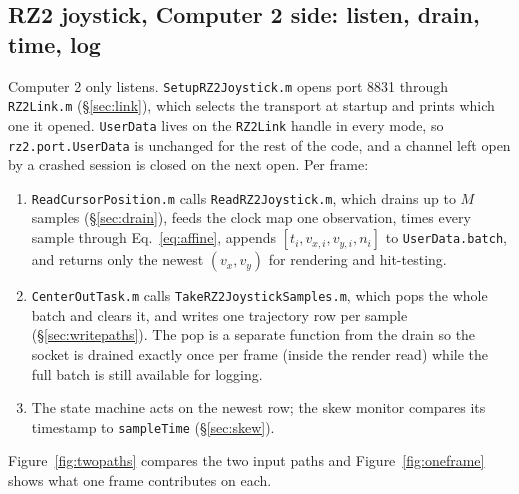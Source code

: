 \documentclass[11pt,a4paper]{article}
\newcommand{\code}[1]{\texttt{\small #1}}
\newcommand{\file}[1]{\texttt{\small #1}}
\begin{document}
\subsection{RZ2 joystick, Computer 2 side: listen, drain, time, log}

Computer 2 only listens. \file{SetupRZ2Joystick.m} opens port 8831 through
\file{RZ2Link.m} (\S\ref{sec:link}), which selects the transport at startup and
prints which one it opened. \code{UserData} lives on the \file{RZ2Link} handle
in every mode, so \code{rz2.port.UserData} is unchanged for the rest of the
code, and a channel left open by a crashed session is closed on the next open.
Per frame:

\begin{enumerate}[leftmargin=*,itemsep=2pt]
\item \file{ReadCursorPosition.m} calls \file{ReadRZ2Joystick.m}, which drains
up to $M$ samples (\S\ref{sec:drain}), feeds the clock map one observation,
times every sample through Eq.~\eqref{eq:affine}, appends
$[t_i, v_{x,i}, v_{y,i}, n_i]$ to \code{UserData.batch}, and returns only the
newest $(v_x, v_y)$ for rendering and hit-testing.
\item \file{CenterOutTask.m} calls \file{TakeRZ2JoystickSamples.m}, which pops
the whole batch and clears it, and writes one trajectory row per sample
(\S\ref{sec:writepaths}). The pop is a separate function from the drain so the
socket is drained exactly once per frame (inside the render read) while the full
batch is still available for logging.
\item The state machine acts on the newest row; the skew monitor compares its
timestamp to \code{sampleTime} (\S\ref{sec:skew}).
\end{enumerate}

Figure~\ref{fig:twopaths} compares the two input paths and
Figure~\ref{fig:oneframe} shows what one frame contributes on each.
\end{document}
